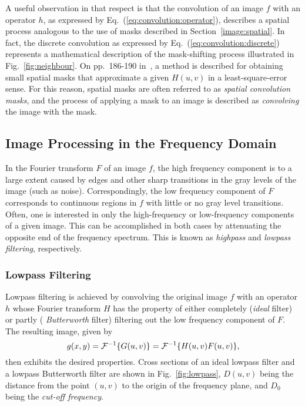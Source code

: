 A useful observation in that respect is that the convolution of an
image $f$ with an operator $h$, as expressed by
Eq.~(\ref{eq:convolution:operator}), describes a spatial process
analogous to the use of masks described in
Section~\ref{image:spatial}.  In fact, the discrete convolution as
expressed by Eq.~(\ref{eq:convolution:discrete}) represents a
mathematical description of the mask-shifting process illustrated in
Fig.~\ref{fig:neighbour}.  On pp.\ 186-190 in~\cite{digim}, a method
is described for obtaining small spatial masks that approximate a
given $H(u,v)$ in a least-square-error sense.  For this reason,
spatial masks are often referred to as {\em spatial convolution
  masks\/}, and the process of applying a mask to an image is
described as {\em convolving\/} the image with the mask.

\subsection{Image Processing in the Frequency Domain}
\label{image:frequency:image}

In the Fourier transform $F$ of an image $f$, the high frequency
component is to a large extent caused by edges and other sharp
transitions in the gray levels of the image (such as noise).
Correspondingly, the low frequency component of $F$ corresponds to
continuous regions in $f$ with little or no gray level transitions.
Often, one is interested in only the high-frequency or low-frequency
components of a given image.  This can be accomplished in both cases
by attenuating the opposite end of the frequency spectrum.  This is
known as {\em highpass\/} and {\em lowpass filtering\/}, respectively.

\subsubsection{Lowpass Filtering}

Lowpass filtering is achieved by convolving the original image $f$
with an operator $h$ whose Fourier transform $H$ has the property of
either completely ({\em ideal\/} filter) or partly ({\em
  Butterworth\/} filter) filtering out the low frequency component of
$F$.  The resulting image, given by
\begin{equation}
  g(x,y)={\cal F}^{-1}\{G(u,v)\}={\cal F}^{-1}\{H(u,v)F(u,v)\}\mbox{,}
\end{equation}
then exhibits the desired properties.  Cross sections of an ideal
lowpass filter and a lowpass Butterworth filter are shown in
Fig.~\ref{fig:lowpass}, $D(u,v)$ being the distance from the point
$(u,v)$ to the origin of the frequency plane, and $D_{0}$ being the
{\em cut-off frequency\/}.

